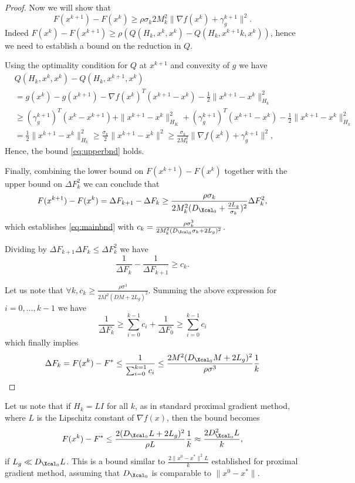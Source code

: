 \documentclass[11pt]{article}
\numberwithin{equation}{section}
\begin{document}
\begin{proof}
	Now we will show that 
	\begin{equation}\label{eq:upperbnd}
	F(x^{k+1})-F(x^k)\geq {\rho\sigma_k}{2M_k^2}\|\nabla f(x^k)+\gamma_g^{k+1}\|^2.
	\end{equation}
	Indeed $F(x^{k})-F(x^{k+1})\geq \rho (Q(H_k, x^{k}, x^k)-Q(H_k,x^{k+1}k, x^k))$, hence we need to establish a bound on the reduction in $Q$.   

	Using the optimality condition for $Q$ at $x^{k+1}$ and convexity of $g$ we have
	    \begin{align}
	    &Q(H_k,x^k,x^k) - Q(H_k,x^{k+1}, x^k) \\
	    &= g(x^k) - g(x^{k+1}) -  \nabla f(x^k)^T( x^{k+1}-x^k)  - \frac{1}{2}\|x^{k+1}-x^k\|^2_{H_k} \nonumber \\
	    \nonumber&\geq ( \gamma_g^{k+1})^T( x^{k}-x^{k+1} ) + \|x^{k+1}-x^k\|_{H_K}^2 +  (\gamma_g^{k+1})^T( x^{k+1}-x^k ) - \frac{1}{2}\|x^{k+1}-x^k\|^2_{H_k} \\
	    \nonumber&= \frac{1}{2}\|x^{k+1}-x^k\|^2_{H_k} \geq \frac{\sigma_k}{2}\|x^{k+1}-x^k\|^2\geq \frac{\sigma_k}{2M_k^2}   \| \nabla f(x^k) + \gamma_g^{k+1}\| ^2,  \end{align}
	Hence, the bound \eqref{eq:upperbnd} holds.



	Finally, combining the lower bound on $F(x^{k+1})-F(x^k)$ together with the upper bound on $\Delta F_k^2$  we can conclude that
	\[
	F(x^{k+1})-F(x^k)=\Delta F_{k+1}-\Delta F_k\geq  \frac{\rho\sigma_k}{2M_k^2 (D_{\Xcal_0}+\frac{2L_g}{\sigma_k})^2}\Delta F_k^2,
	\]
	which establishes \eqref{eq:mainbnd} with $c_k= \frac{\rho\sigma_k^3}{2M_k^2 (D_{\Xcal_0}\sigma_k+2L_g)^2}$. 

	Dividing by $\Delta F_{k+1}\Delta F_k\leq \Delta F_{k}^2$ we have
	\[
	\frac{1}{\Delta F_{k}}-\frac{1}{\Delta F_{k+1}}\geq c_k.
	\]

	Let us note that $\forall k, c_k\geq  \frac{\rho\sigma^3}{2M^2 (DM+2L_g)^2}$. 
	Summing the above expression for  $i=0, \ldots, k-1$ we have
	\[
	\frac{1}{\Delta F_{k}}\geq \sum_{i=0}^{k-1}c_i+\frac{1}{\Delta F_{0}} \geq \sum_{i=0}^{k-1}c_i
	\]
	which finally implies
	\[
	\Delta F_k=F(x^k)-F^*\leq \frac{1}{\sum_{i=0}^{k=1} c_i} \leq  \frac{2M^2 (D_{\Xcal_0}M+2L_g)^2}{\rho\sigma^3}\frac{1}{k}
	\]
\end{proof}

Let us note that if $H_k=LI$ for all $k$, as in standard proximal gradient method, where $L$ is the Lipschitz constant of $\nabla f(x)$, then
the bound becomes
\[
F(x^k)-F^*\leq   \frac{ 2(D_{\Xcal_0}L+2L_g)^2}{\rho L}\frac{1}{k}\approx \frac{ 2D_{\Xcal_0}^2L}{k},
\]
if $L_g\ll D_{\Xcal_0}L$. This is a bound similar to $\frac{2\|x^0-x^*\|^2L}{k}$ established for proximal gradient method, assuming that $D_{\Xcal_0}$ is comparable to
$\|x^0-x^*\|$. 
\end{document}
